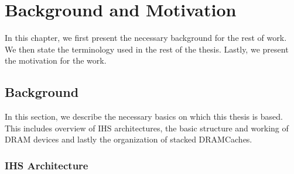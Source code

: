 \chapter{Background and Motivation} \label{chap:background}
In this chapter, we first present the necessary background for the rest of work. We then state the terminology used in the rest of the thesis. Lastly, we present the motivation for the work.

\section{Background}
In this section, we describe the necessary basics on which this thesis is based. This includes overview of IHS architectures, the basic structure and working of DRAM devices and lastly the organization of stacked DRAMCaches.
\subsection{IHS Architecture}

